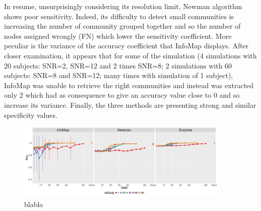 In resume, unsurprisingly considering its resolution limit, Newman algorithm shows poor sensitivity. Indeed, its difficulty to detect small communities is increasing the number of community grouped together and so the number of nodes assigned wrongly (FN) which lower the sensitivity coefficient. 
More peculiar is the variance of the accuracy coefficient that InfoMap displays. After closer examination, it appears that for some of the simulation (4 simulations with 20 subjects: SNR=2, SNR=12 and 2 times SNR=8; 2 simulations with 60 subjects: SNR=8 and SNR=12; many times with simulation of 1 subject), InfoMap was unable to retrieve the right communities and instead was extracted only 2 which had as consequence to give an accuracy value close to 0 and so increase its variance.
Finally, the three methods are presenting strong and similar specificity values. 


\begin{figure}
\includegraphics[width=0.9\textwidth]{images/Simu_Acc_LFRClick_paper.png}
\caption{blabla}
\label{FigAccuracy}
\end{figure}